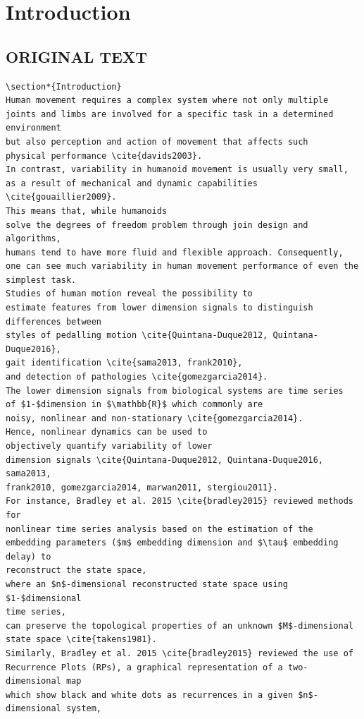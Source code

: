 \documentclass[10pt]{article}
\begin{document}
\section{Introduction}

\subsection{ORIGINAL TEXT}
\begin{verbatim}
\section*{Introduction}
Human movement requires a complex system where not only multiple
joints and limbs are involved for a specific task in a determined environment
but also perception and action of movement that affects such 
physical performance \cite{davids2003}. 
In contrast, variability in humanoid movement is usually very small,
as a result of mechanical and dynamic capabilities \cite{gouaillier2009}. 
This means that, while humanoids 
solve the degrees of freedom problem through join design and algorithms,
humans tend to have more fluid and flexible approach. Consequently, 
one can see much variability in human movement performance of even the simplest task.
Studies of human motion reveal the possibility to 
estimate features from lower dimension signals to distinguish differences between 
styles of pedalling motion \cite{Quintana-Duque2012, Quintana-Duque2016}, 
gait identification \cite{sama2013, frank2010},
and detection of pathologies \cite{gomezgarcia2014}.
The lower dimension signals from biological systems are time series 
of $1-$dimension in $\mathbb{R}$ which commonly are 
noisy, nonlinear and non-stationary \cite{gomezgarcia2014}.
Hence, nonlinear dynamics can be used to 
objectively quantify variability of lower
dimension signals \cite{Quintana-Duque2012, Quintana-Duque2016, sama2013, 
frank2010, gomezgarcia2014, marwan2011, stergiou2011}.
For instance, Bradley et al. 2015 \cite{bradley2015} reviewed methods for
nonlinear time series analysis based on the estimation of the 
embedding parameters ($m$ embedding dimension and $\tau$ embedding delay) to 
reconstruct the state space,
where an $n$-dimensional reconstructed state space using $1-$dimensional 
time series,
can preserve the topological properties of an unknown $M$-dimensional 
state space \cite{takens1981}.
Similarly, Bradley et al. 2015 \cite{bradley2015} reviewed the use of 
Recurrence Plots (RPs), a graphical representation of a two-dimensional map 
which show black and white dots as recurrences in a given $n$-dimensional system, 

\end{verbatim}
\end{document}
